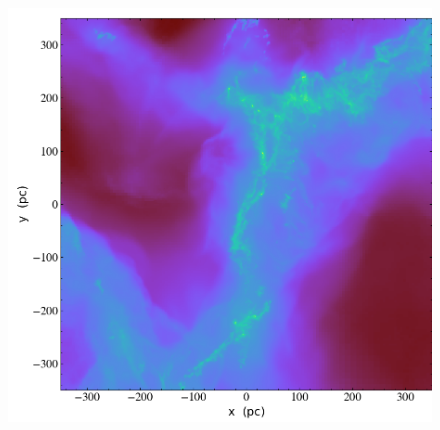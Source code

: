 \documentclass[aspectratio=169]{beamer}
\begin{document}
\begin{frame}
{\begin{figure}[h!]
        \includegraphics[width=0.5\linewidth]{../images/VorAMR_hdf5_chk_0001_Projection_z_dens.png}
    \end{figure}}
\end{frame}
\end{document}
